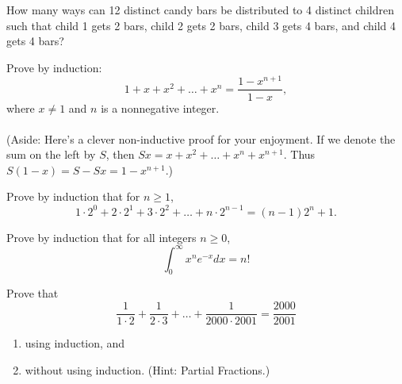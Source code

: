 \documentclass[12pt,letterpaper]{hmcpset}
\newcommand{\f}[2]{\frac{#1}{#2}}
\begin{document}

\begin{problem}[1]
    How many ways can 12 distinct candy bars be distributed to 4 distinct children such that child 1 gets 2 bars, child 2 gets 2 bars, child 3 gets 4 bars, and child 4 gets 4 bars?
\end{problem}
\begin{solution}
    \vfill
\end{solution}
\newpage

\begin{problem}[2]
    Prove by induction:
    \[
        1+x+x^2+\dots+x^n=\f{1-x^{n+1}}{1-x},
    \]
    where $x\neq1$ and $n$ is a nonnegative integer.\\\\
    (Aside: Here's a clever non-inductive proof for your enjoyment. If we denote the sum on the left by $S$, then $Sx=x+x^2+\dots+x^n+x^{n+1}$. Thus $S(1-x)=S-Sx=1-x^{n+1}$.)
\end{problem}
\begin{solution}
    \vfill
\end{solution}
\newpage

\begin{problem}[3]
    Prove by induction that for $n\geq1$,
    \[
        1\cdot2^0+2\cdot2^1+3\cdot2^2+\dots+n\cdot2^{n-1}=(n-1)2^n+1.
    \]
\end{problem}
\begin{solution}
    \vfill
\end{solution}
\newpage

\begin{problem}[4]
    Prove by induction that for all integers $n\geq0$,
    \[
        \int_{0}^{\infty}x^ne^{-x}dx=n!
    \]
\end{problem}
\begin{solution}
    \vfill
\end{solution}
\newpage

\begin{problem}[5]
    Prove that
    \[
        \f{1}{1\cdot2}+\f{1}{2\cdot3}+\dots+\f{1}{2000\cdot2001}=\f{2000}{2001}
    \]
    \begin{enumerate}
        \item using induction, and
        \item without using induction. (Hint: Partial Fractions.)
    \end{enumerate}
\end{problem}
\begin{solution}
    \vfill
\end{solution}
\newpage
\end{document}
